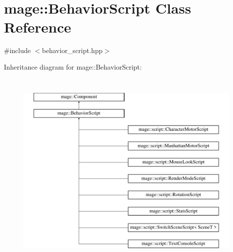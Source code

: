 \hypertarget{classmage_1_1_behavior_script}{}\section{mage\+:\+:Behavior\+Script Class Reference}
\label{classmage_1_1_behavior_script}


{\ttfamily \#include $<$behavior\+\_\+script.\+hpp$>$}

Inheritance diagram for mage\+:\+:Behavior\+Script\+:\begin{figure}[H]
\begin{center}
\leavevmode
\includegraphics[height=10.000000cm]{classmage_1_1_behavior_script}
\end{center}
\end{figure}
